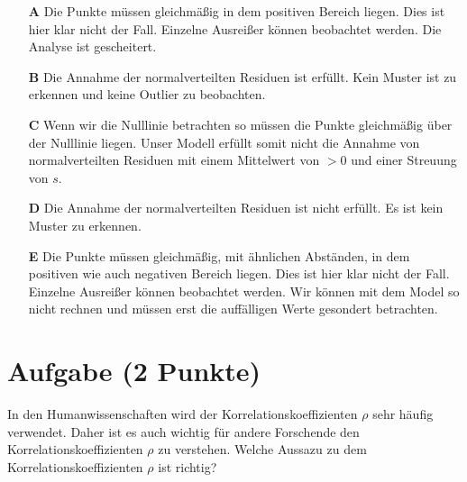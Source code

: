 \documentclass[a4paper, 9pt]{scrartcl}\usepackage[]{graphicx}\usepackage[]{xcolor}
\begin{document}
\begin{enumerate}
\item [\textbf{A} \msquare] Die Punkte müssen gleichmäßig in dem positiven Bereich liegen. Dies ist hier klar nicht der Fall. Einzelne Ausreißer können beobachtet werden. Die Analyse ist gescheitert.
\item [\textbf{B} \msquare] Die Annahme der normalverteilten Residuen ist erfüllt. Kein Muster ist zu erkennen und keine Outlier zu beobachten.
\item [\textbf{C} \msquare] Wenn wir die Nulllinie betrachten so müssen die Punkte gleichmäßig über der Nulllinie liegen. Unser Modell erfüllt somit nicht die Annahme von normalverteilten Residuen mit einem Mittelwert von $>0$ und einer Streuung von $s$.
\item [\textbf{D} \msquare] Die Annahme der normalverteilten Residuen ist nicht erfüllt. Es ist kein Muster zu erkennen.
\item [\textbf{E} \msquare] Die Punkte müssen gleichmäßig, mit ähnlichen Abständen, in dem positiven wie auch negativen Bereich liegen. Dies ist hier klar nicht der Fall. Einzelne Ausreißer können beobachtet werden. Wir können mit dem Model so nicht rechnen und müssen erst die auffälligen Werte gesondert betrachten.
\end{enumerate}

\section{Aufgabe \hfill (2 Punkte)}




In den Humanwissenschaften wird der Korrelationskoeffizienten $\rho$ sehr häufig verwendet. Daher ist es auch wichtig für andere Forschende den Korrelationskoeffizienten $\rho$ zu verstehen. Welche Aussazu zu dem Korrelationskoeffizienten $\rho$ ist richtig?
\end{document}
